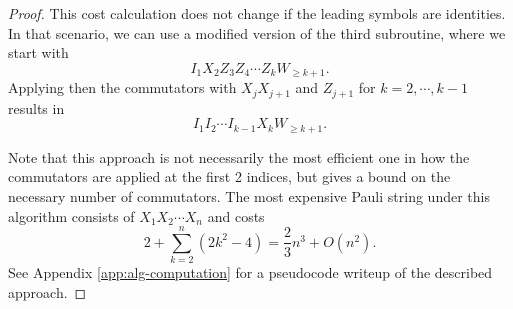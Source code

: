 \documentclass[10pt,a4paper]{amsart}
\begin{document}
\begin{proof}
This cost calculation does not change if the leading symbols are identities. In that scenario, we can use a modified version of the third subroutine, where we start with
\begin{equation}
    I_1 X_2 Z_3 Z_4 \cdots Z_k W_{\geq k+1}.
\end{equation}
Applying then the commutators with $X_j X_{j+1}$ and $Z_{j+1}$ for $ k = 2, \cdots, k-1$ results in
\begin{equation}
    I_1 I_2 \cdots I_{k-1} X_k W_{\geq k+1}.
\end{equation}

Note that this approach is not necessarily the most efficient one in how the commutators are applied at the first 2 indices, but gives a bound on the necessary number of commutators. The most expensive Pauli string under this algorithm consists of $X_1 X_2 \cdots X_n$ and costs
\begin{equation}
    2+\sum_{k=2}^n (2k^2-4) = \frac23 n^3 +O(n^2).
\end{equation}
See Appendix \ref{app:alg-computation} for a pseudocode writeup of the described approach.\end{proof}
\end{document}
